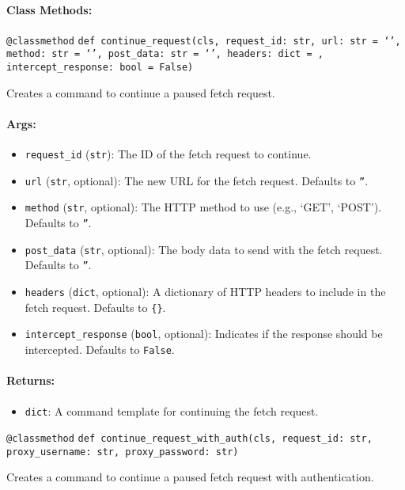 \documentclass{article}
\begin{document}
\paragraph{Class Methods:}
\noindent\texttt{@classmethod}
\noindent\texttt{def continue\_request(cls, request\_id: str, url: str = `', method: str = `', post\_data: str = `', headers: dict = {}, intercept\_response: bool = False)}

\noindent Creates a command to continue a paused fetch request.

\paragraph{Args:}
\begin{itemize}
    \item \texttt{request\_id} (\texttt{str}): The ID of the fetch request to continue.
    \item \texttt{url} (\texttt{str}, optional): The new URL for the fetch request. Defaults to \texttt{''}.
    \item \texttt{method} (\texttt{str}, optional): The HTTP method to use (e.g., `GET', `POST'). Defaults to \texttt{''}.
    \item \texttt{post\_data} (\texttt{str}, optional): The body data to send with the fetch request. Defaults to \texttt{''}.
    \item \texttt{headers} (\texttt{dict}, optional): A dictionary of HTTP headers to include in the fetch request. Defaults to \texttt{\{\}}.
    \item \texttt{intercept\_response} (\texttt{bool}, optional): Indicates if the response should be intercepted. Defaults to \texttt{False}.
\end{itemize}

\paragraph{Returns:}
\begin{itemize}
    \item \texttt{dict}: A command template for continuing the fetch request.
\end{itemize}

\noindent\texttt{@classmethod}
\noindent\texttt{def continue\_request\_with\_auth(cls, request\_id: str, proxy\_username: str, proxy\_password: str)}

\noindent Creates a command to continue a paused fetch request with authentication.
\end{document}
